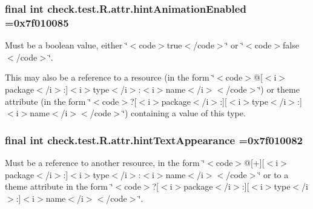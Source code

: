 \subsubsection[{hint\+Animation\+Enabled}]{\setlength{\rightskip}{0pt plus 5cm}final int check.\+test.\+R.\+attr.\+hint\+Animation\+Enabled =0x7f010085\hspace{0.3cm}{\ttfamily [static]}}\label{classcheck_1_1test_1_1_r_1_1attr_ac56c15568d0c8ec982363888f65d9c17}
Must be a boolean value, either \char`\"{}$<$code$>$true$<$/code$>$\char`\"{} or \char`\"{}$<$code$>$false$<$/code$>$\char`\"{}. 

This may also be a reference to a resource (in the form \char`\"{}$<$code$>$@\mbox{[}$<$i$>$package$<$/i$>$\+:\mbox{]}$<$i$>$type$<$/i$>$\+:$<$i$>$name$<$/i$>$$<$/code$>$\char`\"{}) or theme attribute (in the form \char`\"{}$<$code$>$?\mbox{[}$<$i$>$package$<$/i$>$\+:\mbox{]}\mbox{[}$<$i$>$type$<$/i$>$\+:\mbox{]}$<$i$>$name$<$/i$>$$<$/code$>$\char`\"{}) containing a value of this type. \hypertarget{classcheck_1_1test_1_1_r_1_1attr_ad43181e17e280e930e2c2f62ba67cd24}{}
\subsubsection[{hint\+Text\+Appearance}]{\setlength{\rightskip}{0pt plus 5cm}final int check.\+test.\+R.\+attr.\+hint\+Text\+Appearance =0x7f010082\hspace{0.3cm}{\ttfamily [static]}}\label{classcheck_1_1test_1_1_r_1_1attr_ad43181e17e280e930e2c2f62ba67cd24}
Must be a reference to another resource, in the form \char`\"{}$<$code$>$@\mbox{[}+\mbox{]}\mbox{[}$<$i$>$package$<$/i$>$\+:\mbox{]}$<$i$>$type$<$/i$>$\+:$<$i$>$name$<$/i$>$$<$/code$>$\char`\"{} or to a theme attribute in the form \char`\"{}$<$code$>$?\mbox{[}$<$i$>$package$<$/i$>$\+:\mbox{]}\mbox{[}$<$i$>$type$<$/i$>$\+:\mbox{]}$<$i$>$name$<$/i$>$$<$/code$>$\char`\"{}. \hypertarget{classcheck_1_1test_1_1_r_1_1attr_a337a62ef9d44c64d88a4136aca1a5d52}{}
